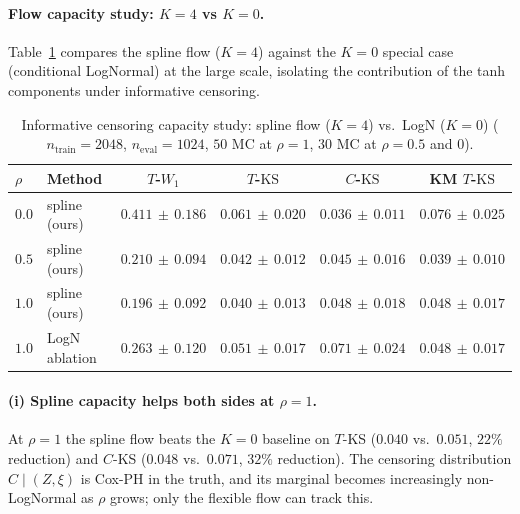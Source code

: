 \paragraph{Flow capacity study: $K{=}4$ vs $K{=}0$.}
Table~\ref{tab:inf-rho} compares the spline flow ($K{=}4$) against the
$K{=}0$ special case (conditional LogNormal) at the large scale,
isolating the contribution of the tanh components under informative
censoring.

\begin{table}[t]
\caption{Informative censoring capacity study: spline flow ($K{=}4$) vs.\ LogN ($K{=}0$)
($n_{\text{train}} = 2048$, $n_{\text{eval}} = 1024$, $50$ MC at
$\rho{=}1$, $30$ MC at $\rho{=}0.5$ and $0$).}
\label{tab:inf-rho}
\centering
\small
\begin{tabular}{llcccc}
\toprule
$\rho$ & Method & $T$-$W_1$ & $T$-$\mathrm{KS}$ & $C$-$\mathrm{KS}$ & KM $T$-$\mathrm{KS}$ \\
\midrule
$0.0$ & spline (ours)  & $0.411\,{\pm}\,0.186$ & $\mathbf{0.061\,{\pm}\,0.020}$ & $\mathbf{0.036\,{\pm}\,0.011}$ & $0.076\,{\pm}\,0.025$ \\
$0.5$ & spline (ours)  & $0.210\,{\pm}\,0.094$ & $\mathbf{0.042\,{\pm}\,0.012}$ & $\mathbf{0.045\,{\pm}\,0.016}$ & $0.039\,{\pm}\,0.010$ \\
$1.0$ & spline (ours)  & $0.196\,{\pm}\,0.092$ & $\mathbf{0.040\,{\pm}\,0.013}$ & $\mathbf{0.048\,{\pm}\,0.018}$ & $0.048\,{\pm}\,0.017$ \\
$1.0$ & LogN ablation  & $0.263\,{\pm}\,0.120$ & $0.051\,{\pm}\,0.017$ & $0.071\,{\pm}\,0.024$ & $0.048\,{\pm}\,0.017$ \\
\bottomrule
\end{tabular}
\end{table}

\paragraph{(i) Spline capacity helps both sides at $\rho{=}1$.}
At $\rho = 1$ the spline flow beats the $K{=}0$ baseline on $T$-KS
($0.040$ vs.\ $0.051$, $22\%$ reduction) and $C$-KS ($0.048$ vs.\
$0.071$, $32\%$ reduction). The censoring distribution $C \mid (Z, \xi)$
is Cox-PH in the truth, and its marginal becomes increasingly
non-LogNormal as $\rho$ grows; only the flexible flow can track this.

